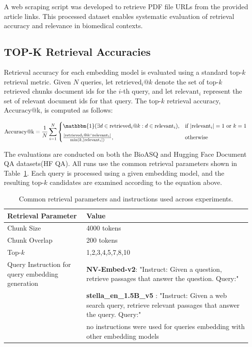 \documentclass[pdflatex,sn-mathphys-num]{sn-jnl}%
\theoremstyle{thmstyleone}%
\theoremstyle{thmstyletwo}%
\theoremstyle{thmstylethree}%
\begin{document}
A web scraping script was developed to retrieve PDF file URLs from the provided article links. This processed dataset enables systematic evaluation of retrieval accuracy and relevance in biomedical contexts.

\subsection{TOP-K Retrieval Accuracies}\label{sec4.2}

Retrieval accuracy for each embedding model is evaluated using a standard top-$k$ retrieval metric. Given $N$ queries, let $\text{retrieved}_i@k$ denote the set of top-$k$ retrieved chunks document ids for the $i$-th query, and let $\text{relevant}_i$ represent the set of relevant document ids for that query. The top-$k$ retrieval accuracy, $\text{Accuracy@k}$, is computed as follows:

\begin{equation}
\text{Accuracy@k} = \frac{1}{N} \sum_{i=1}^{N} 
    \begin{cases}
      \mathbbm{1}(\exists d \in \text{retrieved}_i@k : d \in \text{relevant}_i), & \text{if } |\text{relevant}_i| = 1 \text{ or } k = 1 \\[6pt]
      \frac{|\text{retrieved}_i@k \cap \text{relevant}_i|}{\min(k, |\text{relevant}_i|)}, & \text{otherwise}
    \end{cases}
\end{equation}

The evaluations are conducted on both the BioASQ and Hugging Face Document QA datasets(HF QA). All runs use the common retrieval parameters shown in Table~\ref{table:retrieval_params}. Each query is processed using a given embedding model, and the resulting top-$k$ candidates are examined according to the equation above.

\begin{table}[h]
\centering
\begin{tabular}{|p{4cm}|p{8cm}|}
\hline
\textbf{Retrieval Parameter} & \textbf{Value} \\
\hline
Chunk Size & 4000 tokens \\
Chunk Overlap & 200 tokens \\
Top-$k$ & 1,2,3,4,5,7,8,10 \\
Query Instruction for query embedding generation & \textbf{NV-Embed-v2}: "Instruct: Given a question, retrieve passages that answer the question. Query:" \\ 
~ & \textbf{stella\_en\_1.5B\_v5 }: "Instruct: Given a web search query, retrieve relevant passages that answer the query. Query:" \\
~ & no instructions were used for queries embedding with  other embedding models\\
\hline
\end{tabular}
\caption{Common retrieval parameters and instructions used across experiments.}
\label{table:retrieval_params}
\end{table}
\end{document}
